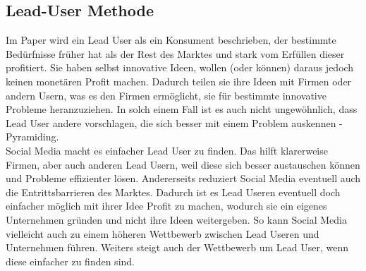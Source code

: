 \subsection{Lead-User Methode}
Im Paper wird ein Lead User als ein Konsument beschrieben, der bestimmte Bed\"urfnisse fr\"uher hat als der Rest des Marktes und stark vom Erf\"ullen dieser profitiert. Sie haben selbst innovative Ideen, wollen (oder k\"onnen) daraus jedoch keinen monet\"aren Profit machen. Dadurch teilen sie ihre Ideen mit Firmen oder andern Usern, was es den Firmen erm\"oglicht, sie f\"ur bestimmte innovative Probleme heranzuziehen. In solch einem Fall ist es auch nicht ungew\"ohnlich, dass Lead User andere vorschlagen, die sich besser mit einem Problem auskennen - Pyramiding.\\
Social Media macht es einfacher Lead User zu finden. Das hilft klarerweise Firmen, aber auch anderen Lead Usern, weil diese sich besser austauschen k\"onnen und Probleme effizienter l\"osen. Andererseits reduziert Social Media eventuell auch die Entrittsbarrieren des Marktes. Dadurch ist es Lead Useren eventuell doch einfacher m\"oglich mit ihrer Idee Profit zu machen, wodurch sie ein eigenes Unternehmen gr\"unden und nicht ihre Ideen weitergeben. So kann Social Media vielleicht auch zu einem h\"oheren Wettbewerb zwischen Lead Useren und Unternehmen f\"uhren. Weiters steigt auch der Wettbewerb um Lead User, wenn diese einfacher zu finden sind.













